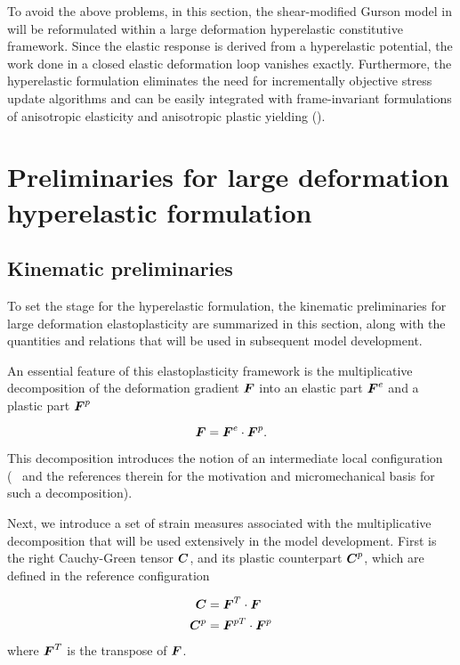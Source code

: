 To avoid the above problems, in this section, the shear-modified Gurson model in \cite{Nahshon2008, Nahshon2009} will be reformulated within a large deformation hyperelastic constitutive framework. Since the elastic response is derived from a hyperelastic potential, the work done in a closed elastic deformation loop vanishes exactly. Furthermore, the hyperelastic formulation eliminates the need for incrementally objective stress update algorithms and can be easily integrated with frame-invariant formulations of anisotropic elasticity and anisotropic plastic yielding (\cite{Belytschko2013}).

\section{Preliminaries for large deformation hyperelastic formulation}

\subsection{Kinematic preliminaries}
To set the stage for the hyperelastic formulation, the kinematic
preliminaries for large deformation elastoplasticity are summarized
in this section, along with the quantities and relations that will be used in
subsequent model development.

An essential feature of this elastoplasticity framework is the
multiplicative decomposition of the deformation gradient ${\boldsymbol{F}}$ into an
elastic part ${\boldsymbol{F}}^e$ and a plastic part ${\boldsymbol{F}}^p$

\begin{equation}
  {\boldsymbol{F}} = {\boldsymbol{F}}^e \cdot {\boldsymbol{F}}^p.
\end{equation}

This decomposition introduces the notion of an intermediate local
configuration (\cf\ \cite{SimoHughes:98} and the references
therein for the motivation and micromechanical basis for such a
decomposition).

Next, we introduce a set of strain measures associated with the
multiplicative decomposition that will be used extensively in the
model development. First is the right Cauchy-Green tensor ${\boldsymbol{C}}$, and
its plastic counterpart ${\boldsymbol{C}}^p$, which are defined in the reference configuration

\begin{align}
  {\boldsymbol{C}} &= {\boldsymbol{F}}^T \cdot {\boldsymbol{F}}\\
  {\boldsymbol{C}}^p &= {\boldsymbol{F}}^{pT} \cdot {\boldsymbol{F}}^p
\end{align}
where ${\boldsymbol{F}}^T$ is the transpose of ${\boldsymbol{F}}$.

